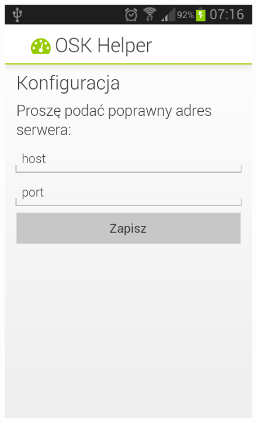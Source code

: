 \documentclass[twoside,a4paper,openright,12pt]{book}
\begin{document}
\begin{figure}[H]
\centering
\begin{minipage}{.48\textwidth}
  \centering
  \includegraphics[width=1\linewidth]{screenshots/android/konfiguracja_serwera.png}
  \label{fig:ekran_poczatkowy1}
\end{minipage}%
\begin{minipage}{.04\textwidth}
   ~
\end{minipage}%
\begin{minipage}{.48\textwidth}

\end{minipage}
\end{figure}
\end{document}
